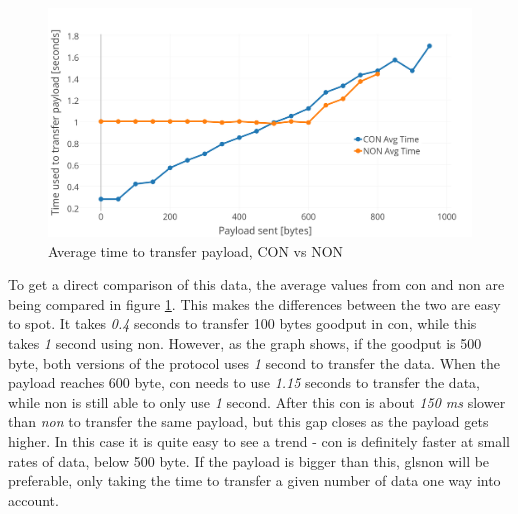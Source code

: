 \begin{figure}[h!]
    \centering
    \includegraphics[width=1.0\textwidth]{avgTimeCONNON.png}    
    \caption{Average time to transfer payload, CON vs NON}
    \label{fig:avgTimeCONNON}
\end{figure}





\noindent To get a direct comparison of this data, the average values from \gls{con} and \gls{non} are being compared in figure \ref{fig:avgTimeCONNON}. This makes the differences between the two are easy to spot. It takes \textit{0.4} seconds to transfer 100 bytes goodput in \gls{con}, while this takes \textit{1} second using \gls{non}. However, as the graph shows, if the goodput is 500 byte, both versions of the protocol uses \textit{1} second to transfer the data. When the \gls{payload} reaches 600 byte, \gls{con} needs to use \textit{1.15} seconds to transfer the data, while \gls{non} is still able to only use \textit{1} second. After this \gls{con} is about \textit{150 ms} slower than \textit{non} to transfer the same payload, but this gap closes as the payload gets higher. In this case it is quite easy to see a trend - \gls{con} is definitely faster at small rates of data, below 500 byte. If the payload is bigger than this, gls{non} will be preferable, only taking the time to transfer a given number of data one way into account.


